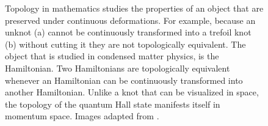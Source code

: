 \begin{figure}[!htb]
\begin{center}
%
\qquad
{}%
\caption{
Topology in mathematics studies the properties of an object that are preserved under continuous deformations.
For example, because an unknot (a) cannot be continuously transformed into a trefoil knot (b) without cutting it they are not topologically equivalent.
The object that is studied in condensed matter physics, is the Hamiltonian.
Two Hamiltonians are topologically equivalent whenever an Hamiltonian can be continuously transformed into another Hamiltonian.
Unlike a knot that can be visualized in space, the topology of the quantum Hall state manifests itself in momentum space.
Images adapted from \cite{wiki_trefoil_knot,wiki_unknot}.
\label{fig:knots}}
\end{center}
\end{figure}

